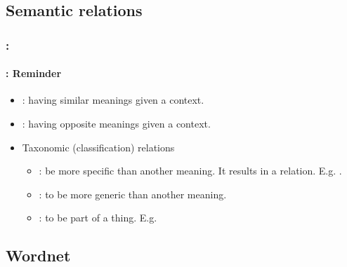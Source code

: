 \documentclass[xcolor=table]{beamer}
\begin{document}
\subsection{Semantic relations}

\begin{frame}
	\frametitle{\insertshortsubtitle: \insertsection}
	\framesubtitle{\insertsubsection: Reminder}

	\begin{itemize}
		\item {}: having similar meanings given a context.
		\item {}: having opposite meanings given a context.
		\item Taxonomic (classification) relations
		\begin{itemize}
			\item {}: be more specific than another meaning. It results in a  relation. E.g. .
			\item {}: to be more generic than another meaning.
			\item {}: to be part of a thing. E.g. 
		\end{itemize}
	\end{itemize}
	
\end{frame}

\subsection{Wordnet}
\end{document}
